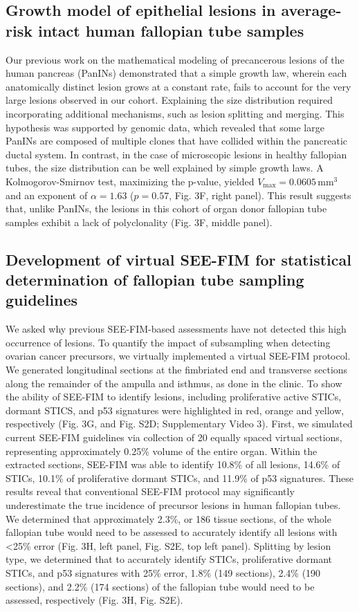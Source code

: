 \begin{refsection}
    \subsection{Growth model of epithelial lesions in average-risk intact human fallopian tube samples}
    Our previous work on the mathematical modeling of precancerous lesions of the human pancreas (PanINs) demonstrated that a simple growth law, wherein each anatomically distinct lesion grows at a constant rate, fails to account for the very large lesions observed in our cohort. Explaining the size distribution required incorporating additional mechanisms, such as lesion splitting and merging. This hypothesis was supported by genomic data, which revealed that some large PanINs are composed of multiple clones that have collided within the pancreatic ductal system. In contrast, in the case of microscopic lesions in healthy fallopian tubes, the size distribution can be well explained by simple growth laws. A Kolmogorov-Smirnov test, maximizing the p-value, yielded \(V_\text{max} = 0.0605 \, \text{mm}^3\) and an exponent of \(\alpha = 1.63\) (\(p = 0.57\), Fig. 3F, right panel). This result suggests that, unlike PanINs, the lesions in this cohort of organ donor fallopian tube samples exhibit a lack of polyclonality (Fig. 3F, middle panel).
    
    \subsection{Development of virtual SEE-FIM for statistical determination of fallopian tube sampling guidelines}
    We asked why previous SEE-FIM-based assessments have not detected this high occurrence of lesions. To quantify the impact of subsampling when detecting ovarian cancer precursors, we virtually implemented a virtual SEE-FIM protocol. We generated longitudinal sections at the fimbriated end and transverse sections along the remainder of the ampulla and isthmus, as done in the clinic. To show the ability of SEE-FIM to identify lesions, including proliferative active STICs,  dormant STICS, and p53 signatures were highlighted in red, orange and yellow, respectively (Fig. 3G, and Fig. S2D; Supplementary Video 3).
    First, we simulated current SEE-FIM guidelines via collection of 20 equally spaced virtual sections, representing approximately 0.25\% volume of the entire organ. Within the extracted sections, SEE-FIM was able to identify 10.8\% of all lesions, 14.6\% of STICs, 10.1\% of proliferative dormant STICs, and 11.9\% of p53 signatures. These results reveal that conventional SEE-FIM protocol may significantly underestimate the true incidence of precursor lesions in human fallopian tubes. We determined that approximately 2.3\%, or 186 tissue sections, of the whole fallopian tube would need to be assessed to accurately identify all lesions with <25\% error (Fig. 3H, left panel, Fig. S2E, top left panel). Splitting by lesion type, we determined that to accurately identify STICs, proliferative dormant STICs, and p53 signatures with 25\% error, 1.8\% (149 sections), 2.4\% (190 sections), and 2.2\% (174 sections) of the fallopian tube would need to be assessed, respectively (Fig. 3H, Fig. S2E). 
    

\end{refsection}
